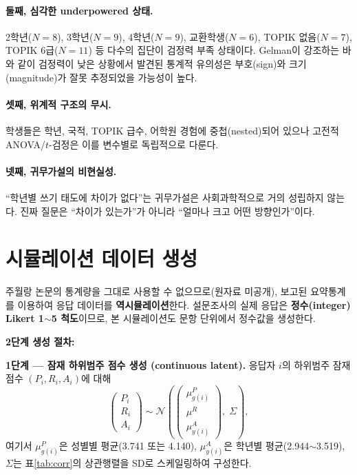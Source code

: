 \documentclass[11pt]{article}
\begin{document}
\paragraph{둘째, 심각한 underpowered 상태.}
2학년($N=8$), 3학년($N=9$), 4학년($N=9$), 교환학생($N=6$), TOPIK 없음($N=7$), TOPIK 6급($N=11$) 등 다수의 집단이 검정력 부족 상태이다. Gelman이 강조하는 바와 같이 검정력이 낮은 상황에서 발견된 통계적 유의성은 부호(sign)와 크기(magnitude)가 잘못 추정되었을 가능성이 높다.

\paragraph{셋째, 위계적 구조의 무시.}
학생들은 학년, 국적, TOPIK 급수, 어학원 경험에 중첩(nested)되어 있으나 고전적 ANOVA/$t$-검정은 이를 변수별로 독립적으로 다룬다.

\paragraph{넷째, 귀무가설의 비현실성.}
``학년별 쓰기 태도에 차이가 없다''는 귀무가설은 사회과학적으로 거의 성립하지 않는다. 진짜 질문은 ``차이가 있는가''가 아니라 ``얼마나 크고 어떤 방향인가''이다.

\section{시뮬레이션 데이터 생성}
\label{sec:sim}

주월랑 논문의 통계량을 그대로 사용할 수 없으므로(원자료 미공개), 보고된 요약통계를 이용하여 응답 데이터를 \textbf{역시뮬레이션}한다. 설문조사의 실제 응답은 \textbf{정수(integer) Likert 1$\sim$5 척도}이므로, 본 시뮬레이션도 문항 단위에서 정수값을 생성한다.

\textbf{2단계 생성 절차:}

\textbf{1단계 — 잠재 하위범주 점수 생성 (continuous latent).} 응답자 $i$의 하위범주 잠재점수 $(P_i, R_i, A_i)$에 대해
\begin{equation}
\begin{pmatrix} P_i \\ R_i \\ A_i \end{pmatrix}
\sim \mathcal{N}\left(
\begin{pmatrix} \mu^P_{g(i)} \\ \mu^R \\ \mu^A_{y(i)} \end{pmatrix},
\;\Sigma \right),
\end{equation}
여기서 $\mu^P_{g(i)}$은 성별별 평균(3.741 또는 4.140), $\mu^A_{y(i)}$은 학년별 평균(2.944$\sim$3.519), $\Sigma$는 표\ref{tab:corr}의 상관행렬을 SD로 스케일링하여 구성한다.
\end{document}
